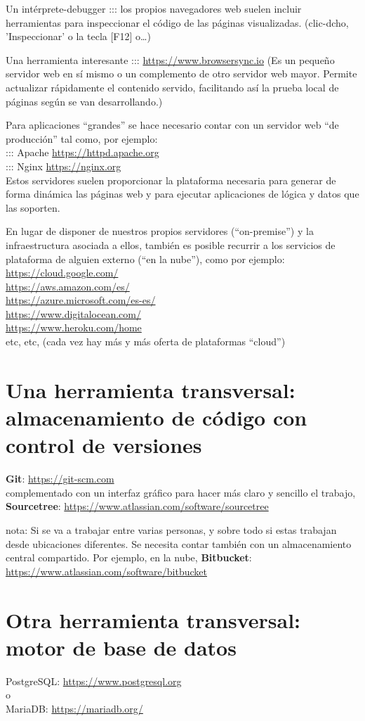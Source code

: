 \documentclass[spanish,12pt,a4paper,final,oneside]{book}
\begin{document}
Un intérprete-debugger ::: los propios navegadores web suelen incluir  herramientas para inspeccionar el código de las páginas visualizadas. (clic-dcho, 'Inspeccionar' o la tecla [F12] o\ldots)

Una herramienta interesante ::: \url{https://www.browsersync.io} (Es un pequeño servidor web en sí mismo o un complemento de otro servidor web mayor. Permite actualizar rápidamente el contenido servido, facilitando así la prueba local de páginas según se van desarrollando.)

Para aplicaciones ``grandes'' se hace necesario contar con un servidor web ``de producción'' tal como, por ejemplo:
\\::: Apache \url{https://httpd.apache.org}
\\::: Nginx \url{https://nginx.org} 
\\Estos servidores suelen proporcionar la plataforma necesaria para generar de forma dinámica las páginas web y para ejecutar aplicaciones de lógica y datos que las soporten. 


En lugar de disponer de nuestros propios servidores (``on-premise'') y la infraestructura asociada a ellos, también es posible recurrir a los servicios de plataforma de alguien externo (``en la nube''), como por ejemplo:
\\ \url{https://cloud.google.com/}
\\ \url{https://aws.amazon.com/es/}
\\ \url{https://azure.microsoft.com/es-es/}
\\ \url{https://www.digitalocean.com/}
\\ \url{https://www.heroku.com/home}
\\ etc, etc, (cada vez hay más y más oferta de plataformas ``cloud'')


\section{Una herramienta transversal: almacenamiento de código con control de versiones}

\textbf{Git}: \url{https://git-scm.com}
\\complementado con un interfaz gráfico para hacer más claro y sencillo el trabajo, 
\textbf{Sourcetree}: \url{https://www.atlassian.com/software/sourcetree} 

nota: Si se va a trabajar entre varias personas, y sobre todo si estas trabajan desde ubicaciones diferentes. Se necesita contar también con un almacenamiento central compartido. Por ejemplo, en la nube, \textbf{Bitbucket}: \url{https://www.atlassian.com/software/bitbucket} 

\section{Otra herramienta transversal: motor de base de datos}
PostgreSQL: \url{https://www.postgresql.org}
\\o\\
MariaDB: \url{https://mariadb.org/}
\end{document}
